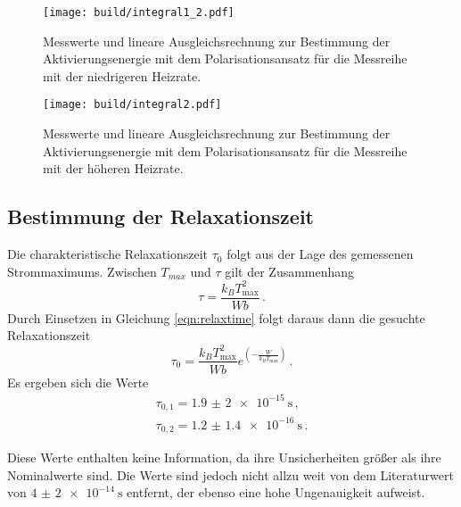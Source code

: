 \begin{figure}
  \centering
  \texttt{[image: build/integral1\_2.pdf]}
  \caption{Messwerte und lineare Ausgleichsrechnung zur Bestimmung der Aktivierungsenergie mit dem Polarisationsansatz für
  die Messreihe mit der niedrigeren Heizrate.}
  \label{fig:integral1_2}
\end{figure}
\begin{figure}
  \centering
  \texttt{[image: build/integral2.pdf]}
  \caption{Messwerte und lineare Ausgleichsrechnung zur Bestimmung der Aktivierungsenergie mit dem Polarisationsansatz für
  die Messreihe mit der höheren Heizrate.}
  \label{fig:integral2}
\end{figure}

\subsection{Bestimmung der Relaxationszeit}

Die charakteristische Relaxationszeit $\tau_0$ folgt aus der Lage des gemessenen Strommaximums.
Zwischen $T_{max}$ und $\tau$ gilt der Zusammenhang
\begin{equation*}
	\tau=\frac{k_B T_{\text{max}}^2}{W b} \,.
\end{equation*}
Durch Einsetzen in Gleichung \eqref{eqn:relaxtime} folgt daraus dann die
gesuchte Relaxationszeit
\begin{equation*}
	\tau_0=\frac{k_B T_{\text{max}}^2}{W b} e^{\left(-\frac{W}{k_B T_{\text{max}}}\right)} \,.
\end{equation*}
Es ergeben sich die Werte
\begin{align}
	\tau_{0,1}=\SI{1.9(20)e-15}{\second} \,, \\
	\tau_{0,2}=\SI{1.2(14)e-16}{\second} \,.
\end{align}

Diese Werte enthalten keine Information, da ihre Unsicherheiten größer als ihre Nominalwerte sind. Die Werte sind jedoch nicht allzu weit von dem Literaturwert von $\SI{4(2)e-14}{\second}$ \cite{lit} entfernt, der ebenso eine hohe Ungenauigkeit aufweist.
